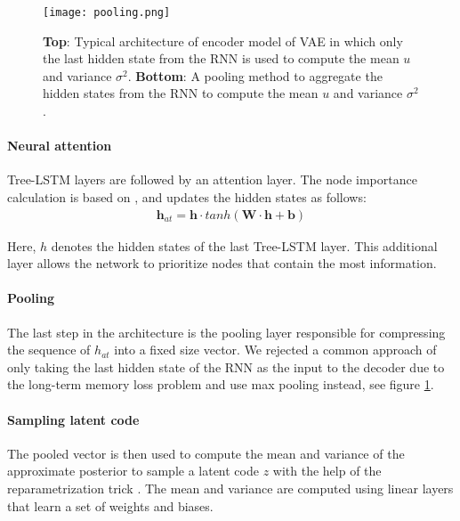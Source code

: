 \begin{figure}[ht!]
    \centering
    \texttt{[image: pooling.png]}
    \caption[RNN pooling]{\textbf{Top}: Typical architecture of encoder model of VAE in which only the last hidden state from the RNN is used to compute the mean $u$ and variance $\sigma^2$. \textbf{Bottom}: A pooling method to aggregate the hidden states from the RNN to compute the mean $u$ and variance $\sigma^2$.}
    \label{fig:pooling}
\end{figure}




\paragraph{Neural attention} Tree-LSTM layers are followed by an attention layer. 
The node importance calculation is based on \cite{winata2018attention}, and updates the hidden states as follows:
\begin{align}
    \mathbf{h}_{at} = \mathbf{h} \cdot tanh(\mathbf{W} \cdot \mathbf{h} + \mathbf{b})
\end{align}

Here, $h$ denotes the hidden states of the last Tree-LSTM layer. This additional layer allows the network to prioritize nodes that contain the most information. 


\paragraph{Pooling} 
The last step in the architecture is the pooling layer responsible for compressing the sequence of $h_{at}$ into a fixed size vector. 
We rejected a common \cite{fabius2015variational} approach of only taking the last hidden state of the RNN as the input to the decoder due to the long-term memory loss problem \cite{kao2020comparison} and use max pooling instead, see figure \ref{fig:pooling}.



\paragraph{Sampling latent code} The pooled vector is then used to compute the mean and variance of the approximate posterior to sample a latent code $z$ with the help of the reparametrization trick \cite{kingma2013auto}. The mean and variance are computed using linear layers that learn a set of weights and biases. 




